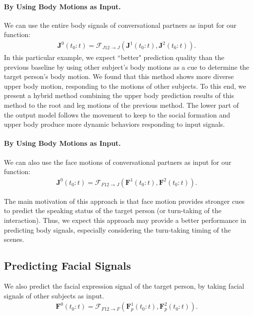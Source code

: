 \paragraph{By Using Body Motions as Input.} We can use the entire body signals of conversational partners as input for our function:
\begin{gather}	
\mathbf{J}^0 (t_0:t) = \mathcal{F}_{J12\rightarrow J} \left( \mathbf{J}^1 (t_0:t), \mathbf{J}^2 (t_0:t) \right) .
\end{gather}
In this particular example, we expect ``better" prediction quality than the previous baseline by using other subject's body motions as a cue to determine the target person's body motion. We found that this method shows more diverse upper body motion, responding to the motions of other subjects. To this end, we present a hybrid method combining the upper body prediction results of this method to the root and leg motions of the previous method. The lower part of the output model follows the movement to keep to the social formation and upper body produce more dynamic behaviors responding to input signals.

\paragraph{By Using Body Motions as Input.} We can also use the face motions of conversational partners as input for our function:
\begin{gather}	
\mathbf{J}^0 (t_0:t) = \mathcal{F}_{F12\rightarrow J} \left( \mathbf{F}^1 (t_0:t), \mathbf{F}^2 (t_0:t) \right) .
\end{gather}

The main motivation of this approach is that face motion provides stronger cues to predict the speaking status of the target person (or turn-taking of the interaction). Thus, we expect this approach may provide a better performance in predicting body signals, especially considering the turn-taking timing of the scenes. 

\subsection{Predicting Facial Signals}
We also predict the facial expression signal of the target person, by taking facial signals of other subjects as input. 
\begin{gather}	
\mathbf{F}^0(t_0:t) = \mathcal{F}_{F12\rightarrow F} \left( \mathbf{F}_p^1(t_0:t), \mathbf{F}_p^2(t_0:t) \right).
\end{gather}